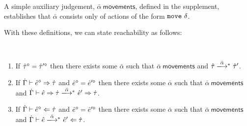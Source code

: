 A simple auxiliary judgement, $\bar\alpha~\mathsf{movements}$, defined in
the supplement, establishes that $\bar\alpha$ consists only of actions of
the form $\mathtt{move}~\delta$.

With these definitions, we can state reachability as follows:

\begin{theorem}[Reachability]\label{thrm:reachability} ~
  \begin{enumerate}[itemsep=0px,partopsep=0px,topsep=0px]
  \item If $\hat{\tau}^{\diamond}=\hat{\tau}'^{\diamond}$ then there exists some
    $\bar\alpha$ such that $\bar{\alpha}~\mathsf{movements}$ and
    $\performTypI{\ztau}{\bar\alpha}{\ztau'}$.

  \item If $\dot{\Gamma} \vdash \hat{e}^{\diamond} \Rightarrow \dot{\tau}$ and
    $\hat{e}^{\diamond}=\hat{e}'^{\diamond}$ then there exists some
    $\bar{\alpha}$ such that $\bar{\alpha}~\mathsf{movements}$ and
    $\performSynI{\hGamma}{\zexp}{\htau}{\bar\alpha}{\zexp'}{\htau}$.

  \item If $\dot{\Gamma} \vdash \hat{e}^{\diamond} \Leftarrow \dot{\tau}$ and
    $\hat{e}^{\diamond}=\hat{e}'^{\diamond}$ then there exists some
    $\bar{\alpha}$ such that $\bar{\alpha}~\mathsf{movements}$ and
    $\performAnaI{\hGamma}{\zexp}{\htau}{\bar{\alpha}}{\zexp'}$.
  \end{enumerate}
\end{theorem}

